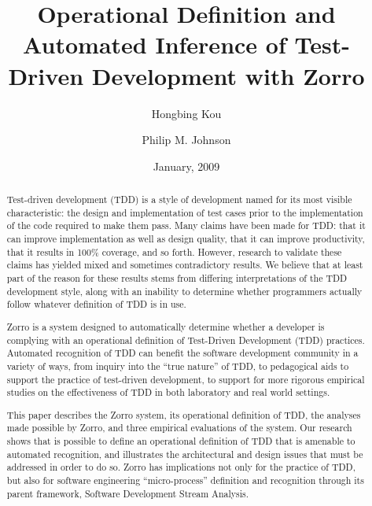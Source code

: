 \documentclass[smallextended]{svjour3}     %
\begin{document}
\title{Operational Definition and Automated Inference of Test-Driven Development with Zorro}
\author{Hongbing Kou \and Philip M. Johnson}

\date{January, 2009}

\maketitle

\begin{abstract}

Test-driven development (TDD) is a style of development named for its most
visible characteristic: the design and implementation of test cases prior
to the implementation of the code required to make them pass. Many claims
have been made for TDD: that it can improve implementation as well as
design quality, that it can improve productivity, that it results in 100\%
coverage, and so forth.  However, research to validate these claims has
yielded mixed and sometimes contradictory results.  We believe that at
least part of the reason for these results stems from differing
interpretations of the TDD development style, along with an inability to
determine whether programmers actually follow whatever definition of
TDD is in use.

Zorro is a system designed to automatically determine whether a developer
is complying with an operational definition of Test-Driven Development
(TDD) practices.  Automated recognition of TDD can benefit the software
development community in a variety of ways, from inquiry into the ``true
nature'' of TDD, to pedagogical aids to support the practice of test-driven
development, to support for more rigorous empirical studies on the
effectiveness of TDD in both laboratory and real world settings.

This paper describes the Zorro system, its operational definition of TDD,
the analyses made possible by Zorro, and three empirical evaluations of the
system.  Our research shows that is possible to define an operational
definition of TDD that is amenable to automated recognition, and
illustrates the architectural and design issues that must be addressed in
order to do so.  Zorro has implications not only for the practice of TDD,
but also for software engineering ``micro-process'' definition and
recognition through its parent framework, Software Development Stream
Analysis.



\end{abstract}
\end{document}
